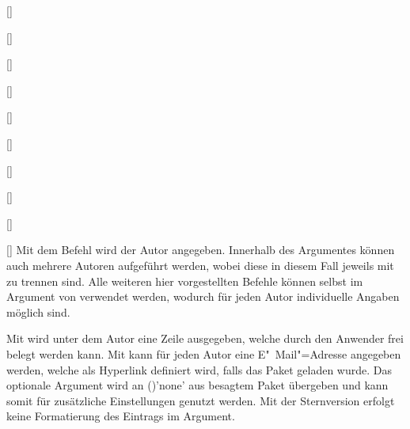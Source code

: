 \begin{Declaration*}{}
\begin{Declaration*}{}
\begin{Declaration*}{}
\begin{Declaration}{[]}
\begin{Declaration}{[]}
\begin{Declaration}{%
  []%
}
\begin{Declaration}{[]}
\begin{Declaration}{[]}
\begin{Declaration}{[]}
\begin{Declaration}{[]}
\begin{Declaration}{[]}
\begin{Declaration}{[]}
\begin{Declaration}{[]}
\printdeclarationlist%
%
%
%
%
Mit dem Befehl  wird der Autor angegeben. Innerhalb des 
Argumentes können auch mehrere Autoren aufgeführt werden, wobei diese in diesem 
Fall jeweils mit  zu trennen sind. Alle weiteren hier vorgestellten 
Befehle können selbst im Argument von  verwendet werden, wodurch 
für jeden Autor individuelle Angaben möglich sind.

Mit  wird unter dem Autor eine Zeile ausgegeben, welche 
durch den Anwender frei belegt werden kann. Mit  kann für 
jeden Autor eine E"~Mail"=Adresse angegeben werden, welche als Hyperlink
definiert wird, falls das Paket  geladen wurde. Das optionale 
Argument wird an ()'none' aus besagtem
Paket übergeben und kann somit für zusätzliche Einstellungen genutzt werden. 
Mit der Sternversion  erfolgt keine Formatierung des 
Eintrags im Argument.


\end{Declaration}
\end{Declaration}
\end{Declaration}
\end{Declaration}
\end{Declaration}
\end{Declaration}
\end{Declaration}
\end{Declaration}
\end{Declaration}
\end{Declaration}
\end{Declaration*}
\end{Declaration*}
\end{Declaration*}
